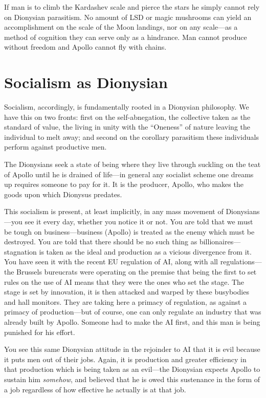 \documentclass[11pt]{article}
\begin{document}
If man is to climb the Kardashev scale and pierce the stars he simply cannot rely on Dionysian parasitism. No amount of LSD or magic mushrooms can yield an accomplishment on the scale of the Moon landings, nor on any scale---as a method of cognition they can serve only as a hindrance. Man cannot produce without freedom and Apollo cannot fly with chains.

\section{Socialism as Dionysian}
\label{sec:org99712c1}
Socialism, accordingly, is fundamentally rooted in a Dionysian philosophy. We have this on two fronts: first on the self-abnegation, the collective taken as the standard of value, the living in unity with the ``Oneness'' of nature leaving the individual to melt away; and second on the corollary parasitism these individuals perform against productive men.

The Dionysians seek a state of being where they live through suckling on the teat of Apollo until he is drained of life---in general any socialist scheme one dreams up requires someone to pay for it. It is the producer, Apollo, who makes the goods upon which Dionysus predates.

This socialism is present, at least implicitly, in any mass movement of Dionysians---you see it every day, whether you notice it or not. You are told that we must be tough on business---business (Apollo) is treated as the enemy which must be destroyed. You are told that there should be no such thing as billionaires---stagnation is taken as the ideal and production as a vicious divergence from it. You have seen it with the recent EU regulation of AI, along with all regulations---the Brussels bureucrats were operating on the premise that being the first to set rules on the use of AI means that they were the ones who set the stage. The stage is set by innovation, it is then attacked and warped by these busybodies and hall monitors. They are taking here a primacy of regulation, as against a primacy of production---but of course, one can only regulate an industry that was already built by Apollo. Someone had to make the AI first, and this man is being punished for his effort.

You see this same Dionysian attitude in the rejoinder to AI that it is evil because it puts men out of their jobs. Again, it is production and greater efficiency in that production which is being taken as an evil---the Dionysian expects Apollo to sustain him \emph{somehow}, and believed that he is owed this sustenance in the form of a job regardless of how effective he actually is at that job.
\end{document}
